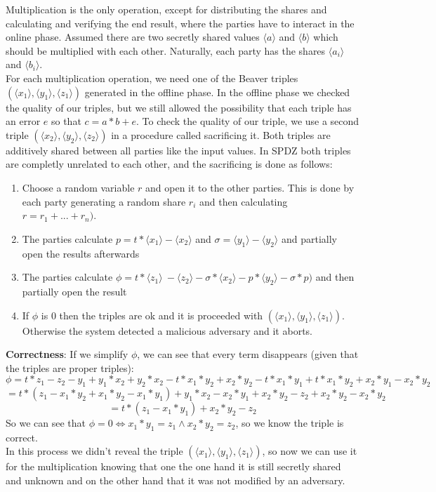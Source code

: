\documentclass[english,runningheads,a4paper]{llncs}[2018/03/10]
\begin{document}
Multiplication is the only operation, except for distributing the shares and calculating and verifying the end result, where the parties have to interact in the online phase.
Assumed there are two secretly shared values \( \langle a \rangle\) and \( \langle b \rangle\) which should be multiplied with each other. Naturally, each party has the shares \(\langle a_i\rangle \) and \(\langle b_i\rangle \).\\
For each multiplication operation, we need one of the Beaver triples \( (\langle x_1 \rangle ,\langle y_1\rangle , \langle z_1\rangle )\) generated in the offline phase. In the offline phase we checked the quality of our triples, but we still allowed the possibility that each triple has an error \(e\) so that \(c=a*b+e\). To check the quality of our triple, we use a second triple \( (\langle x_2 \rangle ,\langle y_2\rangle ,\langle z_2\rangle )\) in a procedure called sacrificing it. Both triples are additively shared between all parties like the input values. In SPDZ both triples are completly unrelated to each other, and the sacrificing is done as follows:\\



\begin{enumerate}
\item Choose a random variable \( r\) and open it to the other parties. This is done by each party generating a random share \(r_i\) and then calculating \(r=r_1+...+r_n)\).
\item The parties calculate  \( p=t*\langle x_1 \rangle - \langle x_2 \rangle \) and \( \sigma=\langle y_1 \rangle -  \langle y_2 \rangle \) and partially open the results afterwards
\item The parties calculate \(\phi = t * \langle z_1 \rangle\ - \langle z_2 \rangle - \sigma * \langle x_2 \rangle - p * \langle y_2 \rangle - \sigma * p)\) and then partially open the result
\item If \( \phi \) is 0 then the triples are ok and it is proceeded with \( (\langle x_1 \rangle ,\langle y_1\rangle , \langle z_1\rangle )\). Otherwise the system detected a malicious adversary and it aborts.\\
\end{enumerate}




\textbf{Correctness}: If we simplify \( \phi \), we can see that every term disappears (given that the triples are proper triples):
$$\phi = t*z_1 - z_2 - y_1 + y_1*x_2 + y_2 * x_2 - t * x_1 * y_2 + x_2*y_2 - t*x_1*y_1 + t*x_1*y_2 + x_2*y_1 - x_2*y_2$$
$$ = t*(z_1 - x_1*y_2+x_1*y_2 -x_1*y_1) + y_1*x_2 - x_2*y_1+ x_2*y_2 - z_2 + x_2*y_2 -  x_2*y_2$$
$$= t* (z_1 - x_1*y_1) + x_2*y_2 - z_2 $$
So we can see that \( \phi = 0 \Leftrightarrow x_1 * y_1 = z_1 \land x_2*y_2=z_2 \), so we know the triple is correct. \\
In this process we didn't reveal the triple \( (\langle x_1 \rangle ,\langle y_1\rangle , \langle z_1\rangle ) \), so now we can use it for the multiplication knowing that one the one hand it is still secretly shared and unknown and on the other hand that it was not modified by an adversary.\\
\end{document}
